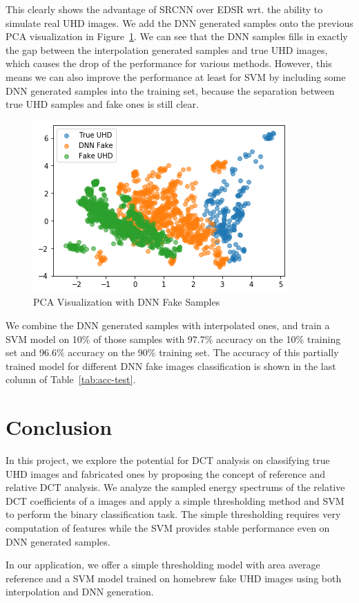 \documentclass[journal,conference]{IEEEtran}
\begin{document}
This clearly shows the advantage of SRCNN over EDSR wrt. the ability to simulate real UHD images.
We add the DNN generated samples onto the previous PCA visualization in Figure~\ref{fig:pca-dnn}.
We can see that the DNN samples fills in exactly the gap between the interpolation generated samples and true UHD images, which causes the drop of the performance for various methods.
However, this means we can also improve the performance at least for SVM by including some DNN generated samples into the training set, because the separation between true UHD samples and fake ones is still clear.

\begin{figure}[h]
	\centering
	\includegraphics[width=0.95\linewidth]{fig/pca_dnn.png}
	\caption{PCA Visualization with DNN Fake Samples}
	\label{fig:pca-dnn}
\end{figure}

We combine the DNN generated samples with interpolated ones, and train a SVM model on 10\% of those samples with 97.7\% accuracy on the 10\% training set and 96.6\% accuracy on the 90\% training set.
The accuracy of this partially trained model for different DNN fake images classification is shown in the last column of Table~\ref{tab:acc-test}.


\section{Conclusion}
In this project, we explore the potential for DCT analysis on classifying true UHD images and fabricated ones by proposing the concept of reference and relative DCT analysis.
We analyze the sampled energy spectrums of the relative DCT coefficients of a images and apply a simple thresholding method and SVM to perform the binary classification task.
The simple thresholding requires very computation of features while the SVM provides stable performance even on DNN generated samples.

In our application, we offer a simple thresholding model with area average reference and a SVM model trained on homebrew fake UHD images using both interpolation and DNN generation.







\end{document}
